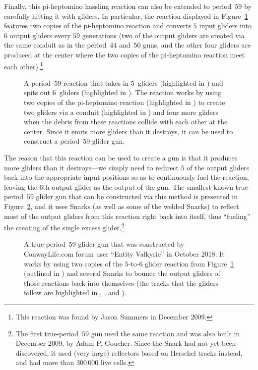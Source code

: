 Finally, this pi-heptomino hassling reaction can also be extended to period~$59$ by carefully hitting it with gliders. In particular, the reaction displayed in Figure~\ref{fig:p59_glider_reaction} features two copies of the pi-heptomino reaction and converts  $5$ input gliders into $6$ output gliders every $59$ generations (two of the output gliders are created via the same conduit as in the period~$44$ and~$50$ guns, and the other four gliders are produced at the center where the two copies of the pi-heptomino reaction meet each other).\footnote{This reaction was found by Jason Summers in December 2009.}
\begin{figure}[!htb]
	\centering
	\caption{A period~$59$ reaction that takes in $5$~gliders (highlighted in ) and spits out $6$~gliders (highlighted in ). The reaction works by using two copies of the pi-heptomino reaction (highlighted in ) to create two gliders via a conduit (highlighted in ) and four more gliders when the debris from these reactions collide with each other at the center. Since it emits more gliders than it destroys, it can be used to construct a period~$59$ glider gun.}\label{fig:p59_glider_reaction}
\end{figure}

The reason that this reaction can be used to create a gun is that it produces more gliders than it destroys---we simply need to redirect $5$ of the output gliders back into the appropriate input positions so as to continuously fuel the reaction, leaving the $6$th output glider as the output of the gun. The smallest-known true-period~$59$ glider gun that can be constructed via this method is presented in Figure~\ref{fig:p59_glider_gun}, and it uses Snarks (as well as some of the welded Snarks) to reflect most of the output gliders from this reaction right back into itself, thus ``fueling'' the creating of the single excess glider.\footnote{The first true-period~$59$ gun used the same reaction and was also built in December 2009, by Adam P. Goucher. Since the Snark had not yet been discovered, it used (very large) reflectors based on Herschel tracks instead, and had more than $300 \, 000$ live cells.}

\begin{figure}[!htb]
	\centering
	\caption{A true-period~$59$ glider gun that was constructed by ConwayLife.com forum user ``Entity Valkyrie'' in October 2018. It works by using two copies of the $5$-to-$6$ glider reaction from Figure~\ref{fig:p59_glider_reaction} (outlined in ) and several Snarks to bounce the output gliders of those reactions back into themselves (the tracks that the gliders follow are highlighted in , , and ).}\label{fig:p59_glider_gun}
\end{figure}

